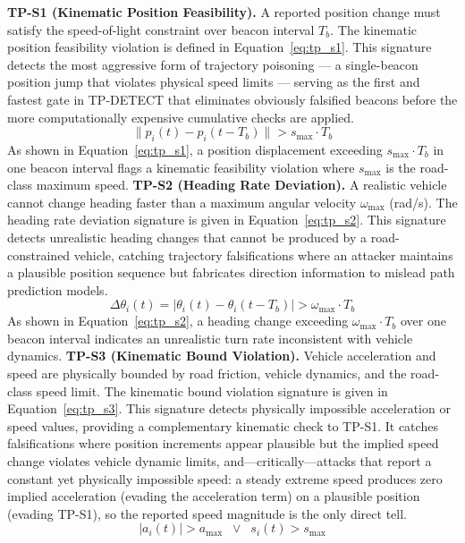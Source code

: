 \documentclass[12pt, a4paper]{report}
\begin{document}
\textbf{TP-S1 (Kinematic Position Feasibility).}
A reported position change must satisfy the speed-of-light constraint
over beacon interval $T_b$. The kinematic position feasibility violation
is defined in Equation~\ref{eq:tp_s1}.
\newline
\newline
This signature detects the most aggressive form of trajectory
poisoning --- a single-beacon position jump that violates physical
speed limits --- serving as the first and fastest gate in TP-DETECT
that eliminates obviously falsified beacons before the more
computationally expensive cumulative checks are applied.
\begin{equation}
  \bigl\|p_i(t) - p_i(t-T_b)\bigr\| > s_{\max} \cdot T_b
  \label{eq:tp_s1}
\end{equation}
As shown in
Equation~\ref{eq:tp_s1}, a position displacement exceeding
$s_{\max} \cdot T_b$ in one beacon interval flags a kinematic
feasibility violation where $s_{\max}$ is the road-class maximum speed.
\newline
\newline
\textbf{TP-S2 (Heading Rate Deviation).}
A realistic vehicle cannot change heading faster than a maximum angular
velocity $\omega_{\max}$ (rad/s). The heading rate deviation signature
is given in Equation~\ref{eq:tp_s2}.
\newline
\newline
This signature detects unrealistic heading changes that cannot be
produced by a road-constrained vehicle, catching trajectory
falsifications where an attacker maintains a plausible position
sequence but fabricates direction information to mislead path
prediction models.
\begin{equation}
  \Delta\theta_i(t) = \bigl|\theta_i(t) - \theta_i(t-T_b)\bigr|
  > \omega_{\max} \cdot T_b
  \label{eq:tp_s2}
\end{equation}
As shown in Equation~\ref{eq:tp_s2}, a heading change exceeding
$\omega_{\max} \cdot T_b$ over one beacon interval indicates an
unrealistic turn rate inconsistent with vehicle dynamics.
\newline
\newline
\textbf{TP-S3 (Kinematic Bound Violation).}
Vehicle acceleration and speed are physically bounded by road friction,
vehicle dynamics, and the road-class speed limit. The kinematic bound
violation signature is given in Equation~\ref{eq:tp_s3}.
\newline
\newline
This signature detects physically impossible acceleration or speed
values, providing a complementary kinematic check to TP-S1. It catches
falsifications where position increments appear plausible but the implied
speed change violates vehicle dynamic limits, and---critically---attacks
that report a constant yet physically impossible speed: a steady
extreme speed produces zero implied acceleration (evading the acceleration
term) on a plausible position (evading TP-S1), so the reported speed
magnitude is the only direct tell.
\begin{equation}
  \bigl|a_i(t)\bigr| > a_{\max}
  \;\;\lor\;\;
  s_i(t) > s_{\max}
  \label{eq:tp_s3}
\end{equation}
\end{document}

